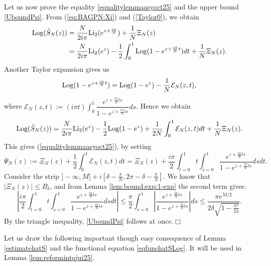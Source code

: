 \documentclass[11pt]{amsart}
\newcommand{\cvd}{\hfill$\Box$}
\newcommand{\Log}{{\rm Log}}
\def\cvd{\hfill$\Box$}
\begin{document}
{Let us now prove the equality \eqref{equalitylemmaasyoct25} and the upper bound \eqref{UboundPsi}.
From (\ref{eq:BAGPN:Xi}) and (\ref{Taylor0}), we obtain
\begin{align*}
\Log(\hat{S}_N(z)) 
&= \frac{N}{2i\pi}{\rm Li_2}(e^{z+\frac{i\pi}{N}})
+ \dfrac{1}{N} \Xi_N(z)\\
&= \frac{N}{2i\pi}{\rm Li_2}(e^{z})  - \frac{1}{2} \int_0^1 \Log(1-e^{z+\frac{i\pi}{N}t}) dt
+ \dfrac{1}{N} \Xi_N(z).
\end{align*}
Another Taylor expansion gives us
\begin{equation}\label{eq:taylor:log:exp}
\Log(1-e^{z+\frac{i\pi}{N}t}) = \Log(1-e^{z}) - \frac{1}{N}\mathcal{E}_N(z,t),
\end{equation}
where $\mathcal{E}_N(z,t):= (i\pi t) \int_0^1 \dfrac{e^{z+\frac{i\pi}{N}ts}}{1-e^{z+\frac{i\pi}{N}ts}}ds$. Hence we obtain
$$
\Log(\hat{S}_N(z)) 
= \frac{N}{2i\pi}{\rm Li_2}(e^{z})  - \frac{1}{2}  \Log(1-e^{z}) 
+ \frac{1}{2N}\int_0^1\mathcal{E}_N(z,t)dt
 + \dfrac{1}{N} \Xi_N(z).
$$
This gives (\ref{equalitylemmaasyoct25}), by setting
\begin{equation}\label{defPsiNjanv26}
\Psi_N(z):= \Xi_N(z)+\dfrac{1}{2}\int_0^1\mathcal{E}_N(z,t)dt
=\Xi_N(z)+\dfrac{i\pi}{2}\int_{t=0}^1 t \int_{s=0}^1\dfrac{e^{z+\frac{i\pi}{N}ts}}{1-e^{z+\frac{i\pi}{N}ts}}dsdt.
\end{equation}
Consider the strip $]-\infty,M] +i[\textstyle \delta-\frac{\pi}{N}, 2\pi-\delta-\frac{\pi}{N}]$. We know that $|\Xi_N(z)|\leq B_\delta$, and from Lemma \ref{lem:bound:exp:1-exp} the second term gives:
$$\left |
\dfrac{i\pi}{2}\int_{t=0}^1 t \int_{s=0}^1\dfrac{e^{z+\frac{i\pi}{N}ts}}{1-e^{z+\frac{i\pi}{N}ts}}dsdt
\right | \leq \dfrac{\pi}{2 } \int_{s=0}^1\left |
 \dfrac{e^{z+\frac{i\pi}{N}ts}}{1-e^{z+\frac{i\pi}{N}ts}} \right | ds
 \leq \dfrac{\pi e^{M/2}}{2\delta\sqrt{1- \frac{\pi^2}{24}}}.$$
By the triangle inequality, \eqref{UboundPsi} follows at once.\cvd
\medskip

Let us draw the following important though easy consequence of Lemma \ref{estimatehatS} and the functional equation \eqref{eqfunchatSLog}. It will be used in Lemma \ref{lem:reformintqjui25}.

}
\end{document}

